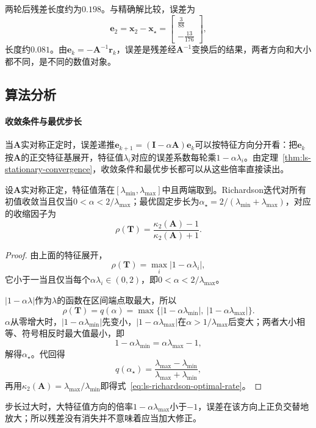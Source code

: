 两轮后残差长度约为$0.198$。与精确解比较，误差为
\[
\bm e_2=\bm x_2-\bm x_\star=\begin{bmatrix}\tfrac3{88}\\-\tfrac{13}{176}\end{bmatrix},
\]
长度约$0.081$。由$\bm e_k=-\bm A^{-1}\bm r_k$，误差是残差经$\bm A^{-1}$变换后的结果，两者方向和大小都不同，是不同的数值对象。

\subsection{算法分析}

\paragraph{收敛条件与最优步长}
当$\bm A$实对称正定时，误差递推$\bm e_{k+1}=(\bm I-\alpha\bm A)\bm e_k$可以按特征方向分开看：把$\bm e_k$按$\bm A$的正交特征基展开，特征值$\lambda_i$对应的误差系数每轮乘$1-\alpha\lambda_i$。由定理~\ref{thm:ls-stationary-convergence}，收敛条件和最优步长都可以从这些倍率直接读出。
\begin{theorem}[对称正定矩阵的Richardson迭代]
\label{thm:ls-richardson-spd}
设$\bm A$实对称正定，特征值落在$[\lambda_{\min},\lambda_{\max}]$中且两端取到。Richardson迭代对所有初值收敛当且仅当$0<\alpha<2/\lambda_{\max}$；最优固定步长为$\alpha_\star=2/(\lambda_{\min}+\lambda_{\max})$，对应的收缩因子为
\begin{equation}
\rho(\bm T)=\frac{\kappa_2(\bm A)-1}{\kappa_2(\bm A)+1}.
 \label{eq:ls-richardson-optimal-rate}
\end{equation}
\end{theorem}
\begin{proof}
由上面的特征展开，
\[
 \rho(\bm T)=\max_i|1-\alpha\lambda_i| ,
\]
它小于一当且仅当每个$\alpha\lambda_i\in(0,2)$，即$0<\alpha<2/\lambda_{\max}$。

$|1-\alpha\lambda|$作为$\lambda$的函数在区间端点取最大，所以
\[
\rho(\bm T)=q(\alpha)=\max\{|1-\alpha\lambda_{\min}|,\ |1-\alpha\lambda_{\max}|\}.
\]
$\alpha$从零增大时，$|1-\alpha\lambda_{\min}|$先变小，$|1-\alpha\lambda_{\max}|$在$\alpha>1/\lambda_{\max}$后变大；两者大小相等、符号相反时最大值最小，即
\[
 1-\alpha\lambda_{\min}=\alpha\lambda_{\max}-1 ,
\]
解得$\alpha_\star$。代回得
\[
 q(\alpha_\star)=\frac{\lambda_{\max}-\lambda_{\min}}{\lambda_{\max}+\lambda_{\min}} ,
\]
再用$\kappa_2(\bm A)=\lambda_{\max}/\lambda_{\min}$即得式~\eqref{eq:ls-richardson-optimal-rate}。
\end{proof}
步长过大时，大特征值方向的倍率$1-\alpha\lambda_{\max}$小于$-1$，误差在该方向上正负交替地放大；所以残差没有消失并不意味着应当加大修正。


